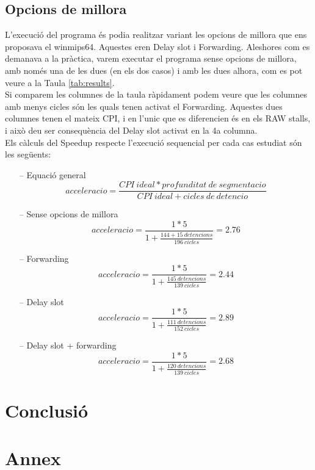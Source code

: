 \documentclass{article}
\begin{document}
\subsection{Opcions de millora}
L'execució del programa és podia realitzar variant les opcions de millora que ens proposava el winmips64. Aquestes eren Delay slot i Forwarding. Aleshores com es demanava a la pràctica, varem executar el programa sense opcions de millora, amb només una de les dues (en els dos casos) i amb les dues alhora, com es pot veure a la Taula \ref{tab:results}.\\
Si comparem les columnes de la taula ràpidament podem veure que les columnes amb menys cicles són les quals tenen activat el Forwarding. Aquestes dues columnes tenen el mateix CPI, i en l'unic que es diferencien és en els RAW stalls, i això deu ser consequència del Delay slot activat en la 4a columna.\\
Els càlculs del Speedup respecte l'execució sequencial per cada cas estudiat són les següents:
\begin{itemize}
\item[--]{Equació general}
$$ acceleracio = \frac{CPI\ ideal * profunditat\ de\ segmentacio}{CPI\ ideal + cicles\ de\ detencio} $$
\item[--]{Sense opcions de millora}
$$ acceleracio = \frac{1 * 5}{1 + \frac{144+15\ detencions}{196\ cicles}}=2.76 $$
\item[--]{Forwarding}
$$ acceleracio = \frac{1 * 5}{1 + \frac{145\ detencions}{139\ cicles}}=2.44 $$
\item[--]{Delay slot}
$$ acceleracio = \frac{1 * 5}{1 + \frac{111\ detencions}{152\ cicles}}=2.89 $$
\item[--]{Delay slot + forwarding}
$$ acceleracio = \frac{1 * 5}{1 + \frac{120\ detencions}{139\ cicles}}=2.68 $$
\end{itemize}


 

\section{Conclusió}

\newpage
\section{Annex}
\end{document}
